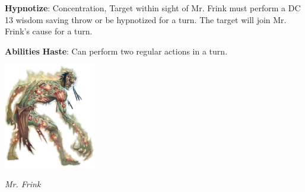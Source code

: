 \noindent\textbf{Hypnotize}: Concentration, Target within sight of Mr. Frink must perform a DC 13 wisdom saving throw or be hypnotized for a turn. The target will join Mr. Frink's cause for a turn.

\noindent\textbf{Abilities}
\noindent\textbf{Haste}: Can perform two regular actions in a turn.

\begin{center}
	\includegraphics[width = 0.3\textwidth]{mr-frink}
	
	\emph{Mr. Frink}
\end{center}